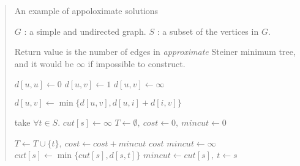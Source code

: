 \documentclass[12pt,uplatex,dvipdfmx,titlepage]{article}
\theoremstyle{case}
\begin{document}
    \begin{quote}
        \begin{algorithm}[]
            \centering
            \caption{An example of appoloximate solutions}
            \begin{algorithmic}[1]
                \Require
                \Statex $G$ : a simple and undirected graph.
                \Statex $S$ : a subset of the vertices in $G$.

                \Ensure
                \Statex Return value is the number of edges in \emph{approximate} Steiner minimum tree, and it would be $\infty$ if impossible to construct.
                \Statex


                 
                    \State $d[u,u] \gets 0$
                            \State $d[u,v] \gets 1$
                        \Else
                            \State $d[u,v] \gets \infty$
                        \EndIf
                    \EndFor
                \EndFor
                \Statex

                 
                            \State $d[u,v] \gets \min\{d[u,v], d[u,i]+d[i,v]\}$
                        \EndFor
                    \EndFor
                \EndFor
                \Statex

                \State take $\forall t\in S$. 
                    $cut[s] \gets \infty$
                \EndFor
                \State $T \gets \emptyset,\ cost \gets 0,\ mincut \gets 0$

                \Loop
                    \State $T \gets T\cup\{t\},\ cost \gets cost+mincut$
                        \State \Return $cost$
                    \EndIf
                    \State $mincut\gets \infty$
                        \State $cut[s] \gets \min\{cut[s],d[s,t]\}$
                            \State $mincut\gets cut[s],\ t \gets s$
                        \EndIf
                    \EndFor
                \EndLoop
                \EndFunction
            \end{algorithmic}
        \end{algorithm}
    \end{quote}
\end{document}
